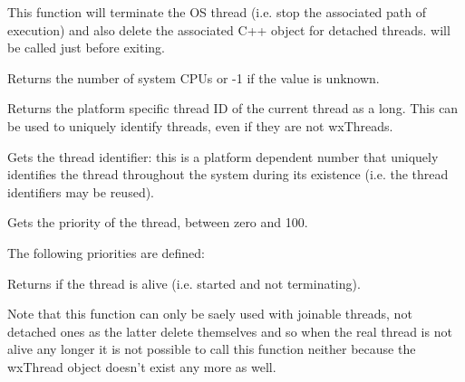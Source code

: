 This function will terminate the OS thread (i.e. stop the associated path of
execution) and also delete the associated C++ object for detached threads.
 will be called just before exiting.


\label{wxthreadgetcpucount}


Returns the number of system CPUs or -1 if the value is unknown.




\label{wxthreadgetcurrentid}


Returns the platform specific thread ID of the current thread as a
long.  This can be used to uniquely identify threads, even if they are
not wxThreads.


\label{wxthreadgetid}


Gets the thread identifier: this is a platform dependent number that uniquely identifies the
thread throughout the system during its existence (i.e. the thread identifiers may be reused).


\label{wxthreadgetpriority}


Gets the priority of the thread, between zero and 100.

The following priorities are defined:

\twocolwidtha{7cm}
\begin{twocollist}\itemsep=0pt
\end{twocollist}


\label{wxthreadisalive}


Returns \true if the thread is alive (i.e. started and not terminating).

Note that this function can only be saely used with joinable threads, not
detached ones as the latter delete themselves and so when the real thread is
not alive any longer it is not possible to call this function neither because
the wxThread object doesn't exist any more as well.


